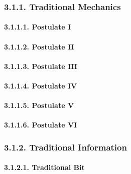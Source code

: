 \documentclass[
]{article}
\begin{document}
\hypertarget{traditional-mechanics-1}{%
\subsubsection{3.1.1. Traditional
Mechanics}\label{traditional-mechanics-1}}

\hypertarget{postulate-i-1}{%
\paragraph{3.1.1.1. Postulate I}\label{postulate-i-1}}

\hypertarget{postulate-ii-1}{%
\paragraph{3.1.1.2. Postulate II}\label{postulate-ii-1}}

\hypertarget{postulate-iii-1}{%
\paragraph{3.1.1.3. Postulate III}\label{postulate-iii-1}}

\hypertarget{postulate-iv-1}{%
\paragraph{3.1.1.4. Postulate IV}\label{postulate-iv-1}}

\hypertarget{postulate-v-1}{%
\paragraph{3.1.1.5. Postulate V}\label{postulate-v-1}}

\hypertarget{postulate-vi-1}{%
\paragraph{3.1.1.6. Postulate VI}\label{postulate-vi-1}}

\hypertarget{traditional-information-1}{%
\subsubsection{3.1.2. Traditional
Information}\label{traditional-information-1}}

\hypertarget{traditional-bit-1}{%
\paragraph{3.1.2.1. Traditional Bit}\label{traditional-bit-1}}
\end{document}
